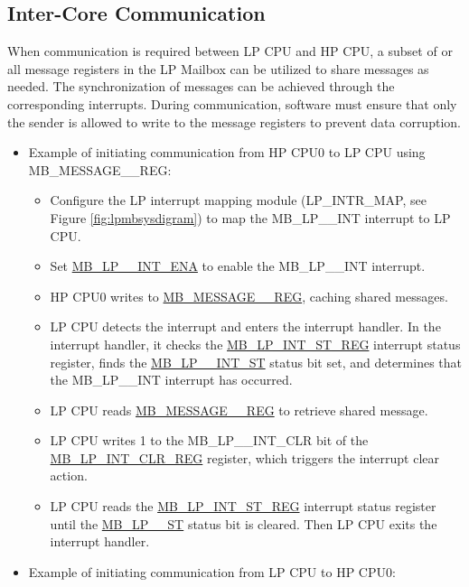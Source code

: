 \documentclass[main\_\_EN.tex]{subfiles}
\begin{document}
\subsection{Inter-Core Communication}
When communication is required between LP CPU and HP CPU, a subset of or all message registers in the LP Mailbox can be utilized to share messages as needed. The synchronization of messages can be achieved through the corresponding interrupts. During communication, software must ensure that only the sender is allowed to write to the message registers to prevent data corruption.

\begin{itemize}
    \item Example of initiating communication from HP CPU0 to LP CPU using MB\_MESSAGE\_\_REG:
    \begin{itemize}
        \item Configure the LP interrupt mapping module (LP\_INTR\_MAP, see Figure \ref{fig:lpmbsysdigram}) to map the MB\_LP\_\_INT interrupt to LP CPU.
        \item Set \hyperref[fielddesc:MBLP0INTENA]{MB\_LP\_\_INT\_ENA} to enable the MB\_LP\_\_INT interrupt.
        \item HP CPU0 writes to \hyperref[regdesc:MBMESSAGE0REG]{MB\_MESSAGE\_\_REG}, caching shared messages.
        \item LP CPU detects the interrupt and enters the interrupt handler. In the interrupt handler, it checks the \hyperref[regdesc:MBLPINTSTREG]{MB\_LP\_INT\_ST\_REG} interrupt status register, finds the \hyperref[fielddesc:MBLP0INTST]{MB\_LP\_\_INT\_ST} status bit set, and determines that the MB\_LP\_\_INT interrupt has occurred.
        \item LP CPU reads \hyperref[regdesc:MBMESSAGE0REG]{MB\_MESSAGE\_\_REG} to retrieve shared message.
        \item LP CPU writes 1 to the {MB\_LP\_\_INT\_CLR} bit of the \hyperref[regdesc:MBLPINTCLRREG]{MB\_LP\_INT\_CLR\_REG} register, which triggers the interrupt clear action.
        \item LP CPU reads the \hyperref[regdesc:MBLPINTSTREG]{MB\_LP\_INT\_ST\_REG} interrupt status register until the \hyperref[fielddesc:MBLP0INTST]{MB\_LP\_\_ST} status bit is cleared. Then LP CPU exits the interrupt handler.
    \end{itemize}
    \item Example of initiating communication from LP CPU to HP CPU0:

\end{itemize}
\end{document}
